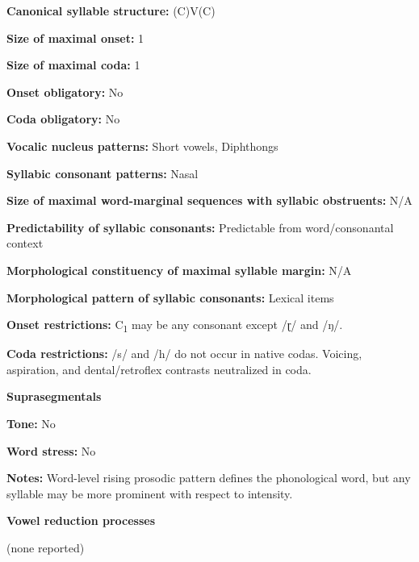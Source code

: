 \textbf{Canonical syllable structure:} (C)V(C) \citep[32-3]{Peterson2011}



\textbf{Size of maximal onset:} 1



\textbf{Size of maximal coda:} 1



\textbf{Onset obligatory:} No



\textbf{Coda obligatory:} No



\textbf{Vocalic nucleus patterns:} Short vowels, Diphthongs



\textbf{Syllabic consonant patterns:} Nasal



\textbf{Size of maximal word{}-marginal sequences with syllabic obstruents:} N/A



\textbf{Predictability of syllabic consonants:} Predictable from word/consonantal context



\textbf{Morphological constituency of maximal syllable margin:} N/A



\textbf{Morphological pattern of syllabic consonants:} Lexical items



\textbf{Onset restrictions:} C\textsubscript{1} may be any consonant except /ɽ/ and /ŋ/.



\textbf{Coda restrictions:} /s/ and /h/ do not occur in native codas. Voicing, aspiration, and dental/retroflex contrasts neutralized in coda.



\textbf{Suprasegmentals}



\textbf{Tone:} No



\textbf{Word stress:} No



\textbf{Notes:} Word-level rising prosodic pattern defines the phonological word, but any syllable may be more prominent with respect to intensity.



\textbf{Vowel reduction processes}



(none reported)



